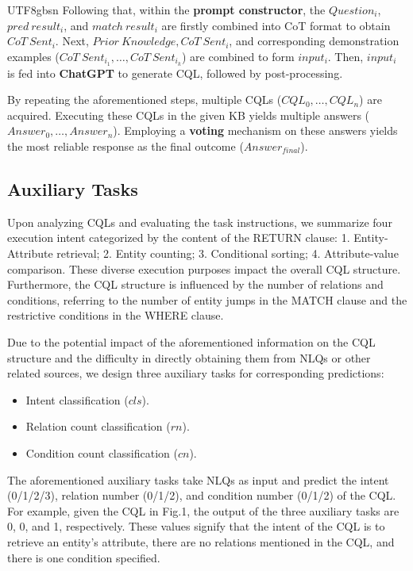 \documentclass[runningheads]{llncs}
\begin{document}
\begin{CJK*}{UTF8}{gbsn}
Following that, within the \textbf{prompt constructor}, the $Question_i$, $pred~result_i$, and $match~result_i$ are firstly combined into CoT format to obtain $CoT~Sent_i$. 
Next, $Prior~Knowledge, CoT~Sent_i$, and corresponding demonstration examples ($CoT~Sent_{i_1}, \dots, CoT~Sent_{i_k}$) are combined to form $input_i$. 
Then, $input_i$ is fed into \textbf{ChatGPT} to generate CQL, followed by post-processing.

By repeating the aforementioned steps, multiple CQLs ($CQL_0, \dots, CQL_n$) are acquired. Executing these CQLs in the given KB yields multiple answers ($Answer_0, \dots, Answer_n$). 
Employing a \textbf{voting} mechanism on these answers yields the most reliable response as the final outcome ($Answer_{final}$).

\subsection{Auxiliary Tasks}
\label{aux_task_section}

Upon analyzing CQLs and evaluating the task instructions, we summarize four execution intent categorized by the content of the \textsf{RETURN} clause: 1. Entity-Attribute retrieval; 2. Entity counting; 3. Conditional sorting; 4. Attribute-value comparison.
These diverse execution purposes impact the overall CQL structure. Furthermore, the CQL structure is influenced by the number of relations and conditions, referring to the number of entity jumps in the \textsf{MATCH} clause and the restrictive conditions in the \textsf{WHERE} clause.

Due to the potential impact of the aforementioned information on the CQL structure and the difficulty in directly obtaining them from NLQs or other related sources, we design three auxiliary tasks for corresponding predictions:

\renewcommand{\labelitemi}{\textbullet}
\begin{itemize}
    \item Intent classification ($cls$).
    \item Relation count classification ($rn$).
    \item Condition count classification ($cn$).
\end{itemize}

The aforementioned auxiliary tasks take NLQs as input and predict the intent (0/1/2/3), relation number (0/1/2), and condition number (0/1/2) of the CQL.
For example, given the CQL in Fig.1, the output of the three auxiliary tasks are 0, 0, and 1, respectively. These values signify that the intent of the CQL is to retrieve an entity's attribute, there are no relations mentioned in the CQL, and there is one condition specified.


\end{CJK*}
\end{document}
